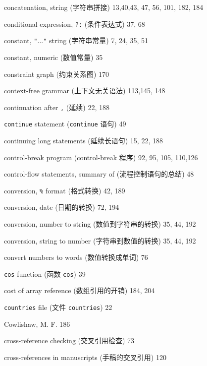 \begin{multicols}{3}
\hangindent=3pc  concatenation, string (字符串拼接) 13,40,43, 47, 56, 101, 182, 184

\hangindent=3pc  conditional expression, \verb'?:' (条件表达式) 37, 68

\hangindent=3pc  constant, \verb'"'...\verb'"' string
(字符串常量) 7, 24, 35, 51

\hangindent=3pc  constant, numeric (数值常量) 35

\hangindent=3pc  constraint graph (约束关系图) 170

\hangindent=3pc  context-free grammar (上下文无关语法) 113,145, 148

\hangindent=3pc  continuation after \verb',' (延续) 22, 188

\hangindent=3pc  \verb'continue' statement (\verb'continue'
语句) 49

\hangindent=3pc  continuing long statements (延续长语句) 15, 22, 188

\hangindent=3pc  control-break program (control-break 程序) 92, 95, 105, 110,126

\hangindent=3pc  control-flow statements, summary of
(流程控制语句的总结) 48

\hangindent=3pc  conversion, \verb'%' format (格式转换) 42, 189

\hangindent=3pc  conversion, date (日期的转换) 72, 194

\hangindent=3pc  conversion, number to string
(数值到字符串的转换) 35, 44, 192

\hangindent=3pc  conversion, string to number
(字符串到数值的转换) 35, 44, 192

\hangindent=3pc  convert numbers to words (数值转换成单词) 76

\hangindent=3pc  \verb'cos' function (函数 \verb'cos') 39

\hangindent=3pc  cost of array reference (数组引用的开销) 184, 204

\hangindent=3pc  \verb'countries' file (文件 \verb'countries') 22

\hangindent=3pc  Cowlishaw, M. F. 186

\hangindent=3pc  cross-reference checking (交叉引用检查) 73

\hangindent=3pc  cross-references in manuscripts
(手稿的交叉引用) 120


\end{multicols}

